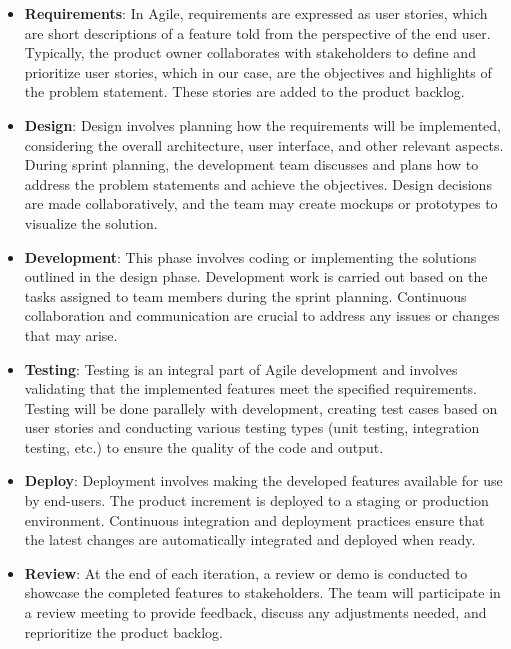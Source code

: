\begin{itemize}
  \item \textbf{Requirements}:
        In Agile, requirements are expressed as user stories, which are short descriptions of a feature told from the perspective of the end user.
        Typically, the product owner collaborates with stakeholders to define and prioritize user stories, which in our case, are the objectives and highlights of the problem statement. These stories are added to the product backlog.

  \item \textbf{Design}:
        Design involves planning how the requirements will be implemented, considering the overall architecture, user interface, and other relevant aspects.
        During sprint planning, the development team discusses and plans how to address the problem statements and achieve the objectives. Design decisions are made collaboratively, and the team may create mockups or prototypes to visualize the solution.\\
  \item \textbf{Development}:
        This phase involves coding or implementing the solutions outlined in the design phase.
        Development work is carried out based on the tasks assigned to team members during the sprint planning. Continuous collaboration and communication are crucial to address any issues or changes that may arise.\\

  \item \textbf{Testing}:
        Testing is an integral part of Agile development and involves validating that the implemented features meet the specified requirements.
        Testing will be done parallely with development, creating test cases based on user stories and conducting various testing types (unit testing, integration testing, etc.) to ensure the quality of the code and output.\\

  \item \textbf{Deploy}:
        Deployment involves making the developed features available for use by end-users.
        The product increment is deployed to a staging or production environment. Continuous integration and deployment practices ensure that the latest changes are automatically integrated and deployed when ready.\\


  \item \textbf{Review}:
        At the end of each iteration, a review or demo is conducted to showcase the completed features to stakeholders.
        The team will participate in a review meeting to provide feedback, discuss any adjustments needed, and reprioritize the product backlog.\\


\end{itemize}
